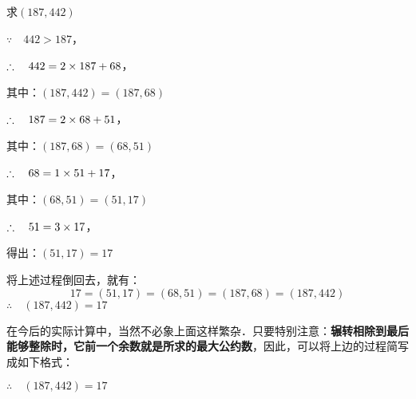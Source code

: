 \begin{example}
求$(187, 442)$    
\end{example}

\begin{solution}
$\because\quad 442>187$，

\begin{multicols}{2}
  \begin{center}
  \end{center}  

$\therefore\quad 442=2\times 187+68$，

其中：$(187,442)=(187,68)$

\begin{center}
\end{center}

$\therefore\quad 187=2\times 68+51$，

其中：$(187,68)=(68,51)$

\begin{center}
\end{center}

$\therefore\quad 68=1\times 51+17$，

其中：$(68,51)=(51,17)$

\begin{center}
\end{center}

$\therefore\quad 51=3\times 17$，

得出：$(51,17)=17$
\end{multicols}

将上述过程倒回去，就有：
\[17= (51, 17) = (68, 51) = (187, 68) = (187, 442)\] 
$\therefore\quad  (187, 442) =17$
\end{solution}


在今后的实际计算中，当然不必象上面这样繁杂．只要特别注意：\textbf{辗转相除到最后能够整除时，它前一个余数就是所求的最大公约数}，因此，可以将上边的过程简写成如下格式：
\begin{center}
\end{center}
$\therefore\quad (187,442)=17$



